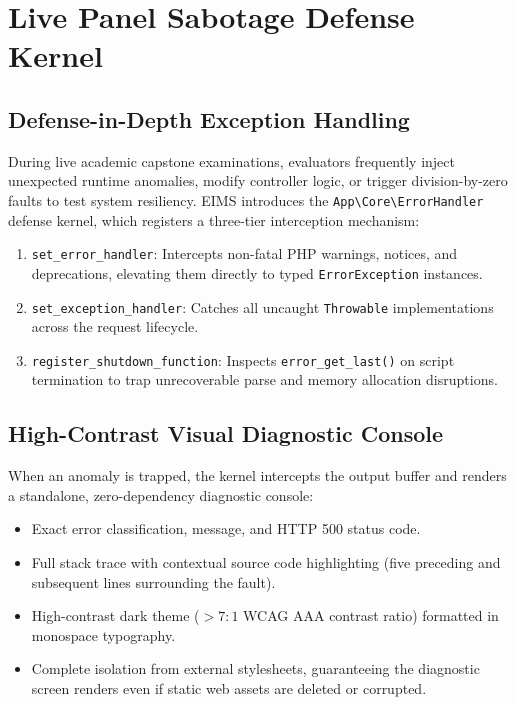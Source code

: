 \section{Live Panel Sabotage Defense Kernel}

\subsection{Defense-in-Depth Exception Handling}
During live academic capstone examinations, evaluators frequently inject unexpected runtime anomalies, modify controller logic, or trigger division-by-zero faults to test system resiliency. EIMS introduces the \texttt{App\textbackslash Core\textbackslash ErrorHandler} defense kernel, which registers a three-tier interception mechanism:
\begin{enumerate}
    \item \texttt{set\_error\_handler}: Intercepts non-fatal PHP warnings, notices, and deprecations, elevating them directly to typed \texttt{ErrorException} instances.
    \item \texttt{set\_exception\_handler}: Catches all uncaught \texttt{Throwable} implementations across the request lifecycle.
    \item \texttt{register\_shutdown\_function}: Inspects \texttt{error\_get\_last()} on script termination to trap unrecoverable parse and memory allocation disruptions.
\end{enumerate}

\subsection{High-Contrast Visual Diagnostic Console}
When an anomaly is trapped, the kernel intercepts the output buffer and renders a standalone, zero-dependency diagnostic console:
\begin{itemize}
    \item Exact error classification, message, and HTTP 500 status code.
    \item Full stack trace with contextual source code highlighting (five preceding and subsequent lines surrounding the fault).
    \item High-contrast dark theme ($>7:1$ WCAG AAA contrast ratio) formatted in monospace typography.
    \item Complete isolation from external stylesheets, guaranteeing the diagnostic screen renders even if static web assets are deleted or corrupted.
\end{itemize}
